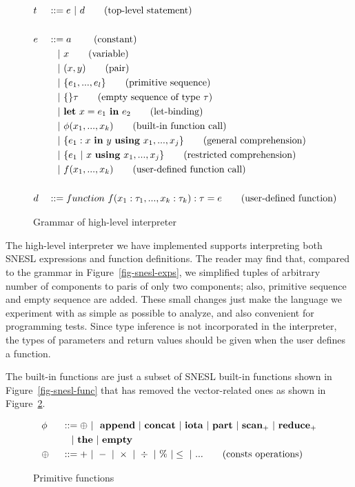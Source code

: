 \begin{figure}[H]
	\begin{alignat*}{2}
	& t &&::= e \ | \ d  \tag{top-level statement} \\
	\\
	& e &&::=  a \     \tag{constant} \\
	&   && \quad | \ x  \tag{variable} \\
	&   && \quad | \ (x,y) \tag{pair}\\
	&   && \quad | \ \{e_1,...,e_l \}	\tag{primitive sequence} \\
	&   && \quad | \ \{ \}\tau			\tag{empty sequence of type $\tau$} \\
	&   && \quad | \ \mathbf{let} \ x = e_1 \ \mathbf{in} \ e_2 \tag{let-binding}\\
	&   && \quad | \ \phi{(x_1,...,x_k)}  \tag{built-in function call} \\
	&   && \quad | \ \{e_1 : x \ \mathbf{in} \ y \ \mathbf{using} \ x_1,...,x_j\} \tag{general comprehension} \\
	&   && \quad | \ \{ e_1 \ | \ x \ \mathbf{using} \ x_1,...,x_j \} \tag {restricted comprehension} \\
	&   && \quad | \ f(x_1,...,x_k)  \tag {user-defined function call} \\
	\\
	& d &&::= function \  f(x_1: \tau_1, ..., x_k: \tau_k): \tau = e  \tag{user-defined function}
	\end{alignat*}
	\caption{Grammar of high-level interpreter  \label{fig-mysnesl}}
\end{figure}

The high-level interpreter we have implemented supports interpreting both SNESL expressions and function definitions. The reader may find that, compared to the grammar in Figure~\ref{fig-snesl-exps}, we simplified tuples of arbitrary number of components to paris of only two components; also, primitive sequence and empty sequence are added. These small changes just make the language we experiment with as simple as possible to analyze, and also convenient for programming tests.
Since type inference is not incorporated in the interpreter, the types of  parameters and return values should be given when the user defines a function.

The built-in functions are just a subset of SNESL built-in functions shown in Figure~\ref{fig-snesl-func} that has removed the vector-related ones as shown in Figure~\ref{fig-mysnesl-func}. 

\begin{figure}[h]
	\begin{alignat*}{2} 
	&\phi && ::= \oplus \ | \  \ \mathbf{append} \ | \ \mathbf{concat}  \ | \ \mathbf{iota}  \ | \ \mathbf{part}  \ | \ \mathbf{scan}_+ \ | \ \mathbf{reduce}_{+} \\
	&   && \quad | \ \mathbf{the}  \ | \ \mathbf{empty} \\
	& \oplus  \ && :: = + \ | \ - \ | \ \times \ |  \  \div \ | \ \% \ | \le \ | \ ... \tag{consts operations} \\
	\end{alignat*}
	\caption{Primitive functions \label{fig-mysnesl-func}}
\end{figure}

